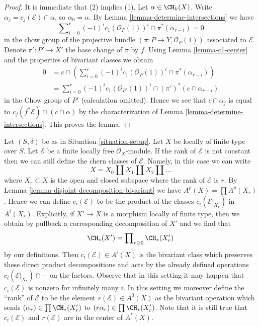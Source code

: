 \begin{proof}
It is immediate that (2) implies (1).
Let $\alpha \in \CH_k(X)$. Write $\alpha_j = c_j(\mathcal{E}) \cap \alpha$, so
$\alpha_0 = \alpha$. By Lemma \ref{lemma-determine-intersections} we have
$$
\sum\nolimits_{i = 0}^r
(-1)^i c_1(\mathcal{O}_P(1))^i \cap
\pi^*(\alpha_{r - i}) = 0
$$
in the chow group of the projective bundle
$(\pi : P \to Y, \mathcal{O}_P(1))$
associated to $\mathcal{E}$. Denote $\pi' : P' \to X'$ the base change
of $\pi$ by $f$. Using Lemma \ref{lemma-c1-center} and
the properties of bivariant classes we obtain
\begin{align*}
0 & = c \cap \left(\sum\nolimits_{i = 0}^r
(-1)^i c_1(\mathcal{O}_P(1))^i \cap
\pi^*(\alpha_{r - i})\right) \\
& =
\sum\nolimits_{i = 0}^r
(-1)^i c_1(\mathcal{O}_{P'}(1))^i \cap
(\pi')^*(c \cap \alpha_{r - i})
\end{align*}
in the Chow group of $P'$ (calculation omitted).
Hence we see that $c \cap \alpha_j$ is
equal to $c_j(f^*\mathcal{E}) \cap (c \cap \alpha)$ by the characterization
of Lemma \ref{lemma-determine-intersections}.
This proves the lemma.
\end{proof}

\begin{remark}
\label{remark-extend-to-finite-locally-free}
Let $(S, \delta)$ be as in Situation \ref{situation-setup}.
Let $X$ be locally of finite type over $S$.
Let $\mathcal{E}$ be a finite locally free $\mathcal{O}_X$-module.
If the rank of $\mathcal{E}$ is not constant then we can
still define the chern classes of $\mathcal{E}$. Namely, in this
case we can write
$$
X = X_0 \amalg X_1 \amalg X_2 \amalg \ldots
$$
where $X_r \subset X$ is the open and closed subspace where
the rank of $\mathcal{E}$ is $r$. By 
Lemma \ref{lemma-disjoint-decomposition-bivariant}
we have $A^p(X) = \prod A^p(X_r)$.
Hence we can define $c_i(\mathcal{E})$ to be the
product of the classes $c_i(\mathcal{E}|_{X_r})$ in $A^i(X_r)$.
Explicitly, if $X' \to X$ is a morphism locally of finite type,
then we obtain by pullback a corresponding decomposition of $X'$
and we find that
$$
\CH_*(X') = \prod\nolimits_{r \geq 0} \CH_*(X'_r)
$$
by our definitions. Then $c_i(\mathcal{E}) \in A^i(X)$
is the bivariant class which preserves these direct
product decompositions and acts by the already defined
operations $c_i(\mathcal{E}|_{X_r}) \cap -$
on the factors. Observe that in this setting it may happen
that $c_i(\mathcal{E})$ is nonzero for infinitely many $i$.
In this setting we moreover define the ``rank'' of $\mathcal{E}$
to be the element $r(\mathcal{E}) \in A^0(X)$
as the bivariant operation which sends $(\alpha_r) \in \prod \CH_*(X'_r)$
to $(r\alpha_r) \in \prod \CH_*(X'_r)$.
Note that it is still true that $c_i(\mathcal{E})$ and $r(\mathcal{E})$
are in the center of $A^*(X)$.
\end{remark}

